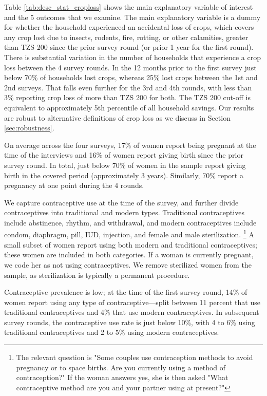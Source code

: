 \documentclass[letterpaper,12pt]{article}
\begin{document}
Table \ref{tab:desc_stat_croploss} shows the main explanatory variable of interest 
and the 5 outcomes that we examine.
The main explanatory variable is a dummy for whether the household experienced 
an accidental loss of crops, which covers any crop lost due to insects, 
rodents, fire, rotting, or other calamities, greater than TZS 200 since the 
prior survey round (or prior 1 year for the first round).
There is substantial variation in the number of households that experience a 
crop loss between the 4 survey rounds.
In the 12 months prior to the first survey just below 70\% of households 
lost crops, whereas 25\% lost crops between the 1st and 2nd surveys.
That falls even further for the 3rd and 4th rounds, with less than 3\% 
reporting crop loss of more than TZS 200 for both.
The TZS 200 cut-off is equivalent to approximately 5th 
percentile of all household savings.
Our results are robust to alternative definitions of crop loss as we
discuss in Section \ref{sec:robustness}.


On average across the four surveys, 17\% of women report being pregnant 
at the time of the interviews and 16\% of women report giving birth since the 
prior survey round.
In total, just below 70\% of women in the sample report giving birth in
the covered period (approximately 3 years).
Similarly, 70\% report a pregnancy at one point during the 4 rounds.


We capture contraceptive use at the time of the survey, and further divide
contraceptives into traditional and modern types. 
Traditional contraceptives include abstinence, rhythm, and withdrawal, 
and modern contraceptives include condom, diaphragm, pill, IUD, injection,
and female and male sterilization.%
\footnote{
The relevant question is "Some couples use contraception methods to avoid
pregnancy or to space births. Are you currently using a method of contraception?"
If the woman answers yes, she is then asked "What contraceptive method are you
and your partner using at present?"
}
A small subset of women report using both modern and traditional contraceptives;
these women are included in both categories.
If a woman is currently pregnant, we code her as not using contraceptives.
We remove sterilized women from the sample, as sterilization is typically a 
permanent procedure.

Contraceptive prevalence is low; at the time of the first survey round, 14\% 
of women report using any type of contraceptive---split between 11 percent that use 
traditional contraceptives and 4\% that use modern contraceptives.
In subsequent survey rounds, the contraceptive use rate is just below 10\%, 
with 4 to 6\% using traditional contraceptives and 2 to 5\% 
using modern contraceptives.
\end{document}
